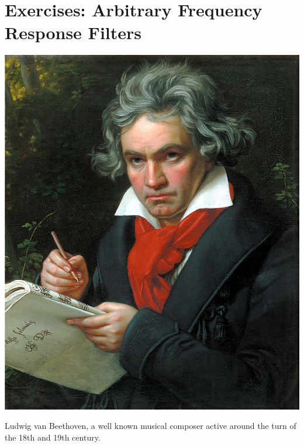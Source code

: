 \newpage
\section{Exercises: Arbitrary Frequency Response Filters}

\begin{marginfigure}
\begin{center}
    \includegraphics[height=0.25\textheight]{ch17/figures/Beethoven.jpg}
\end{center}
\caption{Ludwig van Beethoven, a well known musical composer active around the turn of the 18th and 19th century.}
\label{fig:beet}
\end{marginfigure}

